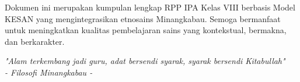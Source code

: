 \documentclass[12pt,a4paper]{article}
\begin{document}
\vfill
\begin{center}
\begin{tcolorbox}[enhanced,
    colback=lightgray!30,
    colframe=black,
    boxrule=2pt,
    arc=5mm,
    width=13cm,
    title={\centering\textbf{\large PENUTUP}},
    fonttitle=\bfseries,
    coltitle=white,
    colbacktitle=darkgray]
\centering
{\fontsize{11}{14}\selectfont Dokumen ini merupakan kumpulan lengkap RPP IPA Kelas VIII berbasis Model KESAN yang mengintegrasikan etnosains Minangkabau. Semoga bermanfaat untuk meningkatkan kualitas pembelajaran sains yang kontekstual, bermakna, dan berkarakter.}

\vspace{0.3cm}

{\fontsize{10}{12}\selectfont\textit{"Alam terkembang jadi guru, adat bersendi syarak, syarak bersendi Kitabullah"}}\\
{\fontsize{9}{11}\selectfont\textit{- Filosofi Minangkabau -}}
\end{tcolorbox}
\end{center}
\end{document}
